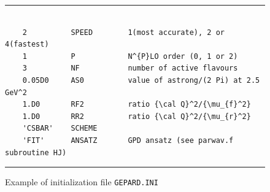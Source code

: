 \documentclass[12pt]{article}
\begin{document}
\begin{figure}[t]
\begin{center}
\hrule
\begin{verbatim}

    2          SPEED        1(most accurate), 2 or 4(fastest)
    1          P            N^{P}LO order (0, 1 or 2)
    3          NF           number of active flavours
    0.05D0     AS0          value of astrong/(2 Pi) at 2.5 GeV^2
    1.D0       RF2          ratio {\cal Q}^2/{\mu_{f}^2}
    1.D0       RR2          ratio {\cal Q}^2/{\mu_{r}^2}
    'CSBAR'    SCHEME       
    'FIT'      ANSATZ       GPD ansatz (see parwav.f subroutine HJ)

\end{verbatim}
\hrule
\end{center}
\caption{Example of initialization file \texttt{GEPARD.INI}}
\label{fig:GEPARD.INI}
\end{figure}
\end{document}

